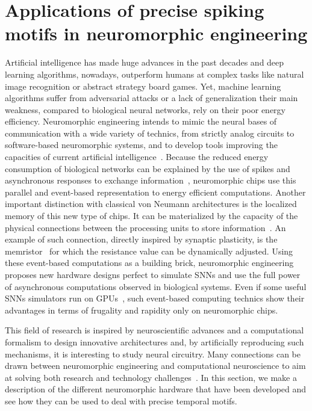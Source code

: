 \documentclass[brainsci, %
               review,submit,pdftex,moreauthors
               ]{Definitions/mdpi}
\begin{document}
\section{Applications of precise spiking motifs in neuromorphic engineering}
\label{sec:neuromorphic}
%
Artificial intelligence has made huge advances in the past decades and deep learning algorithms, nowadays, outperform humans at complex tasks like natural image recognition or abstract strategy board games. Yet, machine learning algorithms suffer from adversarial attacks or a lack of generalization  their main weakness, compared to biological neural networks, rely on their poor energy efficiency. Neuromorphic engineering intends to mimic the neural bases of communication with a wide variety of technics, from strictly analog circuits to software-based neuromorphic systems, and to develop tools improving the capacities of current artificial intelligence~\citep{roy_towards_2019}. Because the reduced energy consumption of biological networks can be explained by the use of spikes and asynchronous responses to exchange information~\citep{maass_networks_1997}, neuromorphic chips use this parallel and event-based representation to  energy efficient computations. Another important distinction with classical von Neumann architectures is the localized memory of this new type of chips. It can be materialized by the capacity of the physical connections between the processing units to store information~\citep{markovic_physics_2020}. An example of such connection, directly inspired by synaptic plasticity, is the memristor~\citep{rasetto_challenges_2022} for which the resistance value can be dynamically adjusted. Using these event-based computations as a building brick, neuromorphic engineering proposes new hardware designs perfect to simulate SNNs and use the full power of asynchronous computations observed in biological systems. Even if some useful SNNs simulators run on GPUs~\citep{diesmann_nest_2003, hazan_bindsnet_2018, stimberg_brian_2019}, such event-based computing technics show their advantages in terms of frugality and rapidity only on neuromorphic chips. 

This field of research is inspired by neuroscientific advances and a computational formalism to design innovative architectures and, by artificially reproducing such mechanisms, it is interesting to study neural circuitry. Many connections can be drawn between neuromorphic engineering and computational neuroscience to aim at solving both research and technology challenges~\citep{zenke_visualizing_2021}. In this section, we make a description of the different neuromorphic hardware that have been developed and see how they can be used to deal with precise temporal motifs. 
%
\end{document}
